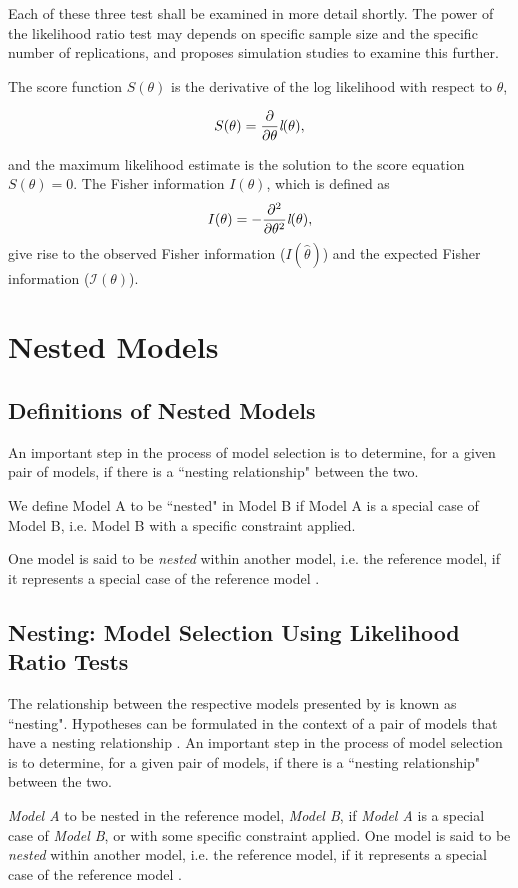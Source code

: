 \documentclass[12pt, a4paper]{article}
\begin{document}
Each of these three test shall be examined in more detail shortly. The power of the likelihood ratio test may depends on specific sample size and the specific number of replications, and \citet{ARoy2009} proposes simulation studies to examine this further.
	
The score function $S(\theta)$ is the derivative of the log likelihood with respect to $\theta$,
	
	\[
	S(\theta) = \frac{\partial}{\partial \theta}\emph{l}(\theta),
	\]
	
and the maximum likelihood estimate is the solution to the score equation $	S(\theta) = 0.$	The Fisher information $I(\theta)$, which is defined as
	\[
	I(\theta) = - \frac{\partial^2}{\partial \theta^2}\emph{l}(\theta),
	\]
give rise to the observed Fisher information ($I(\hat{\theta})$) and the expected Fisher information ($\mathcal{I}(\theta)$).
	
\section{Nested Models }

\subsection{Definitions of Nested Models}
An important step in the process of model selection is to determine, for a given pair of models, if there is a ``nesting relationship" between the two.

We define Model A to be ``nested" in Model B if Model A is a special case of Model B, i.e. Model B with a specific constraint applied.

One model is said to be \emph{nested} within another model, i.e. the reference model, if it represents a special case of the reference model \citep{pb}.
\subsection{Nesting: Model Selection Using Likelihood Ratio Tests}
The relationship between the respective models presented by \citet{ARoy2009} is known as ``nesting".
Hypotheses can be formulated in the context of a pair of models that have a nesting relationship \citet{west}.
An important step in the process of model selection is to determine, for a given pair of models, if there is a ``nesting relationship" between the two.

\textit{Model A} to be nested in the reference model, \textit{Model B}, if \textit{Model A} is a special case of \textit{Model B}, or with some specific constraint applied. One model is said to be \emph{nested} within another model, i.e. the reference model, if it represents a special case of the reference model \citep{PB}.
\end{document}
